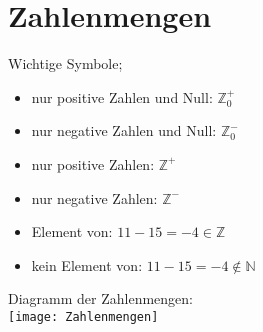 \section{Zahlenmengen}

\hfill \break
Wichtige Symbole;
\begin{itemize}
    \item nur positive Zahlen und Null:  $\mathbb{Z}_0^{+}$
    \item nur negative Zahlen und Null: $\mathbb{Z}_0^{-}$
    \item nur positive Zahlen: $\mathbb{Z}^{+}$
    \item nur negative Zahlen: $\mathbb{Z}^{-}$
    \item Element von: $11-15 = -4 \in \mathbb{Z}$
    \item kein Element von: $11-15 = -4 \notin \mathbb{N}$
\end{itemize}

Diagramm der Zahlenmengen:\\
\hfill \break
\texttt{[image: Zahlenmengen]}

\break

\break

\break

\break



